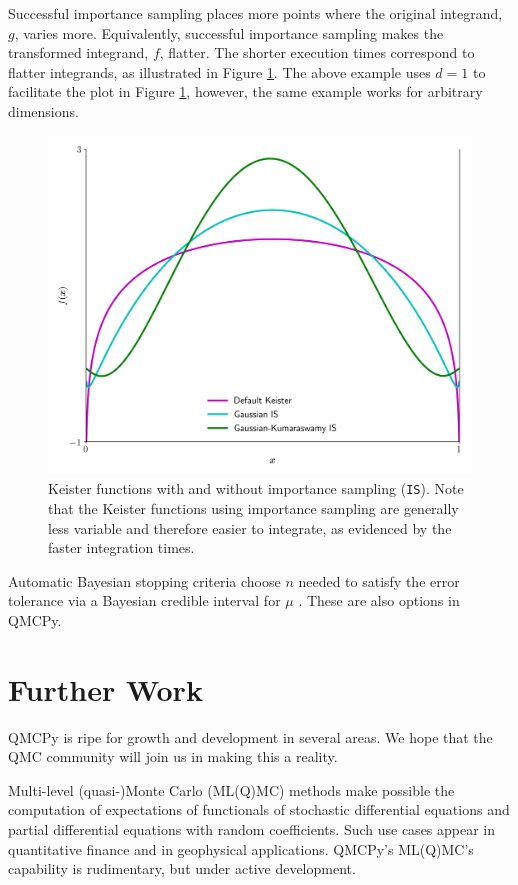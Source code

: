 \documentclass[graybox,footinfo]{svmult}
\begin{document}
Successful importance sampling places more points where the original integrand, $g$, varies more.  Equivalently, successful importance sampling makes the transformed integrand, $f$, flatter. The shorter execution times correspond to flatter integrands, as  illustrated in Figure \ref{fig:mIS}. The above example uses $d=1$ to facilitate the plot in Figure \ref{fig:mIS}, however, the same example works for arbitrary dimensions.
\begin{figure}[t]
    \centering
	\includegraphics[width=.8\textwidth]{QMCSoftwareArticle/figs/multiple_IS.png}
	\caption{Keister functions with and without importance sampling (\texttt{IS}). Note that the Keister functions using importance sampling are generally less variable and therefore easier to integrate, as evidenced by the faster integration times.} \label{fig:mIS}
\end{figure}

Automatic Bayesian stopping criteria choose $n$ needed to satisfy the error tolerance via a Bayesian credible interval for $\mu$ \cite{RatHic19a,JagHic22a}.  These are also options in QMCPy.


\section{Further Work} \label{sec:further}

QMCPy is ripe for growth and development in several areas.  We hope that the QMC community will join us in making this a reality.

Multi-level (quasi-)Monte Carlo (ML(Q)MC) methods make possible the computation of expectations of functionals of stochastic differential equations and partial differential equations with random coefficients.  Such use cases appear in quantitative finance and in geophysical applications.  QMCPy's ML(Q)MC's capability is rudimentary, but under active development.
\end{document}
